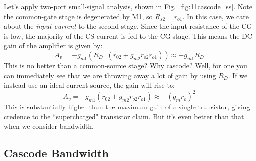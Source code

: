 Let's apply two-port small-signal analysis, shown in Fig.~\ref{fig:11cascode_ss}.  Note the common-gate stage is degenerated by M1, so $R_{s2} = r_{o1}$. In this case, we care about the \textit{input current }to the second stage. Since the input resistance of the CG is low, the majority of the CS current is fed to the CG stage.  This means the DC gain of the amplifier is given by:
%
 \begin{equation}
	 A_v = -g_{m1} \left(R_D || (r_{02} + g_{m2}r_{o2} r_{o1}) \right) \approx -g_{m1} R_D
\end{equation}
%
This is no better than a common-source stage?  Why cascode?  Well, for one you can immediately see that we are throwing away a lot of gain by using $R_D$.  If we instead use an ideal current source, the gain will rise to:
%
 \begin{equation}
	 A_v = -g_{m1}  (r_{02} + g_{m2}r_{o2} r_{o1}) \approx - (g_m r_o)^2 
\end{equation}
%
This is substantially higher than the maximum gain of a single transistor, giving credence to the ``supercharged" transistor claim.  But it's even better than that when we consider bandwidth. 
 



\subsection{Cascode Bandwidth}


